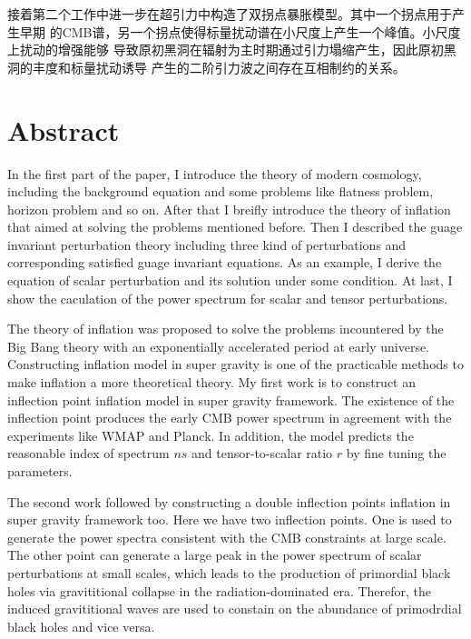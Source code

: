接着第二个工作中进一步在超引力中构造了双拐点暴胀模型。其中一个拐点用于产生早期
的CMB谱，另一个拐点使得标量扰动谱在小尺度上产生一个峰值。小尺度上扰动的增强能够
导致原初黑洞在辐射为主时期通过引力塌缩产生，因此原初黑洞的丰度和标量扰动诱导
产生的二阶引力波之间存在互相制约的关系。

\intobmk\chapter*{Abstract}%

In the first part of the paper, I introduce the theory of modern cosmology,
including the background equation and some problems like flatness problem, 
horizon problem and so on. After that I breifly introduce the theory of 
inflation that aimed at solving the problems mentioned before. Then I
described the guage invariant perturbation theory including three kind of
perturbations and corresponding satisfied guage invariant equations. As an
example, I derive the equation of scalar perturbation and its solution
under some condition. At last, I show the caculation of the power spectrum
for scalar and tensor perturbations.

The theory of inflation was proposed to solve the problems incountered by
the Big Bang theory with an exponentially accelerated period at early
universe. Constructing inflation model in super gravity is one of the
practicable methods to make inflation a more theoretical theory.
My first work is to construct an inflection point inflation model in super gravity
framework. The existence of the inflection point produces the early CMB
power spectrum in agreement with the experiments like WMAP and Planck. In
addition, the model predicts the reasonable index of spectrum $ns$ and
tensor-to-scalar ratio $r$ by fine tuning the parameters.

The second work followed by constructing a double inflection points
inflation in super gravity framework too. Here we have two inflection
points. One is used to generate the power spectra consistent with the CMB
constraints at large scale. The other point can generate a large peak in
the power spectrum of scalar perturbations at small scales, which leads to 
the production of primordial black holes via gravititional collapse in the 
radiation-dominated era. Therefor, the induced gravititional waves are used
to constain on the abundance of primodrdial black holes and vice versa.

